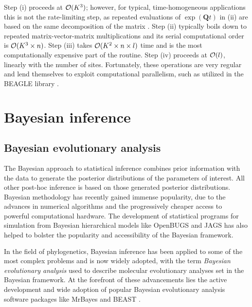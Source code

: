 Step (i) proceeds at ${\cal{O}}(K^3)$; however, for typical, time-homogeneous applications this is not the rate-limiting step, as repeated evaluations of $\exp(\mathbf{Q}t)$ in (ii) are based on the same decomposition of the matrix \citep{Suchard2009}. 
Step (ii) typically boils down to repeated matrix-vector-matrix multiplications and its serial computational order is ${\cal{O}}(K^3 \times n)$. 
Step (iii) takes ${\cal{O}}(K^2 \times n \times l)$ time and is the most computationally expensive part of the routine. 
Step (iv) proceeds at ${\cal{O}}(l)$, linearly with the number of sites.
Fortunately, these operations are very regular and lend themselves to exploit computational parallelism, such as utilized in the BEAGLE library \citep{Suchard2009,Ayres2012}.


\section{Bayesian inference\label{sec:bayesian_inference}}

\subsection{Bayesian evolutionary analysis}

The Bayesian approach to statistical inference combines prior information with the data to generate the posterior distributions of the parameters of interest.
All other post-hoc inference is based on those generated posterior distributions.
Bayesian methodology has recently gained immense popularity, due to the advances in numerical algorithms and the progressively cheaper access to powerful computational hardware.
The development of statistical programs for simulation from Bayesian hierarchical models like OpenBUGS \citep{Lunn2009} and JAGS \citep{Plummer2003} has also helped to bolster the popularity and accessibility of the Bayesian framework.

In the field of phylogenetics, Bayesian inference has been applied to some of the most complex problems and is now widely adopted, with the term \emph{Bayesian evolutionary analysis} used to describe molecular evolutionary analyses set in the Bayesian framework.
At the forefront of these advancements lies the active development and wide adoption of popular Bayesian evolutionary analysis software packages like MrBayes \citep{Ronquist2012} and BEAST \citep{Drummond2012}.

